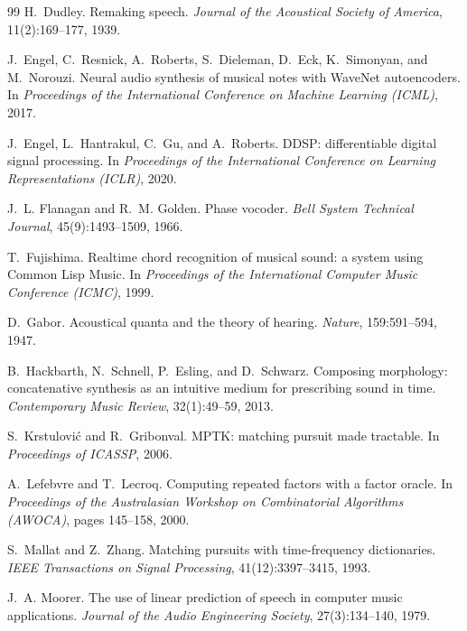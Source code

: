 \documentclass[11pt,a4paper]{article}
\begin{document}
\begin{thebibliography}{99}
H.~Dudley.
\newblock Remaking speech.
\newblock \emph{Journal of the Acoustical Society of America},
  11(2):169--177, 1939.

J.~Engel, C.~Resnick, A.~Roberts, S.~Dieleman, D.~Eck, K.~Simonyan, and
  M.~Norouzi.
\newblock Neural audio synthesis of musical notes with WaveNet
  autoencoders.
\newblock In \emph{Proceedings of the International Conference on Machine
  Learning (ICML)}, 2017.

J.~Engel, L.~Hantrakul, C.~Gu, and A.~Roberts.
\newblock DDSP: differentiable digital signal processing.
\newblock In \emph{Proceedings of the International Conference on Learning
  Representations (ICLR)}, 2020.

J.~L. Flanagan and R.~M. Golden.
\newblock Phase vocoder.
\newblock \emph{Bell System Technical Journal}, 45(9):1493--1509, 1966.

T.~Fujishima.
\newblock Realtime chord recognition of musical sound: a system using Common
  Lisp Music.
\newblock In \emph{Proceedings of the International Computer Music
  Conference (ICMC)}, 1999.

D.~Gabor.
\newblock Acoustical quanta and the theory of hearing.
\newblock \emph{Nature}, 159:591--594, 1947.

B.~Hackbarth, N.~Schnell, P.~Esling, and D.~Schwarz.
\newblock Composing morphology: concatenative synthesis as an intuitive
  medium for prescribing sound in time.
\newblock \emph{Contemporary Music Review}, 32(1):49--59, 2013.

S.~Krstulovi\'c and R.~Gribonval.
\newblock MPTK: matching pursuit made tractable.
\newblock In \emph{Proceedings of ICASSP}, 2006.

A.~Lefebvre and T.~Lecroq.
\newblock Computing repeated factors with a factor oracle.
\newblock In \emph{Proceedings of the Australasian Workshop on Combinatorial
  Algorithms (AWOCA)}, pages 145--158, 2000.

S.~Mallat and Z.~Zhang.
\newblock Matching pursuits with time-frequency dictionaries.
\newblock \emph{IEEE Transactions on Signal Processing}, 41(12):3397--3415,
  1993.

J.~A. Moorer.
\newblock The use of linear prediction of speech in computer music
  applications.
\newblock \emph{Journal of the Audio Engineering Society}, 27(3):134--140,
  1979.


\end{thebibliography}
\end{document}

